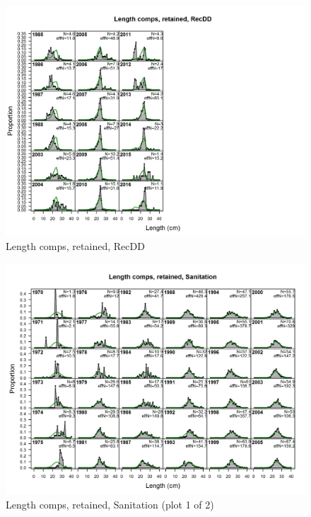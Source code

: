 \documentclass[12pt,]{article}
\begin{document}
\begin{figure}[htbp]
\centering
\includegraphics{./r4ss/plots_mod1/comp_lenfit_flt6mkt2.png}
\caption{Length comps, retained, RecDD
\label{fig:mod1_7_comp_lenfit_flt6mkt2}}
\end{figure}

\begin{figure}[htbp]
\centering
\includegraphics{./r4ss/plots_mod1/comp_lenfit_flt7mkt2_page1.png}
\caption{Length comps, retained, Sanitation (plot 1 of 2)
\label{fig:mod1_8_comp_lenfit_flt7mkt2_page1}}
\end{figure}
\end{document}
